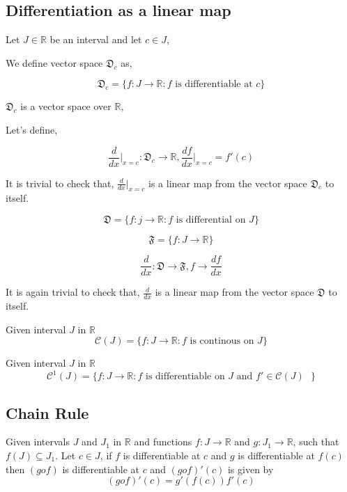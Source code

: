 \documentclass[11pt,a4paper]{colorart}
\def\R{\mathbb{R}}
\def\D{\mathfrak{D}}
\def\ra{\rightarrow}
\begin{document}
\subsection{Differentiation as a linear map}

Let $J \in \R$ be an interval and let $c\in J$,

We define vector space $\D_c$ as,

\[ \D_c = \{ f:J\ra\R : \text{$f$ is differentiable at $c$} \} \]

$\D_c$ is a vector space over $\R$,

Let's define,

\[ \frac{d}{dx} \biggr|_{ x=c } : \D_c \ra \R, \frac{df}{dx} \biggr|_{ x=c } = f'(c) \]

It is trivial to check that, $\frac{d}{dx} \biggr|_{ x=c }$ is a linear map from the vector space $\D_c$ to itself.

\[ \D = \{ f:j \ra \R : \text{$f$ is differential on $J$} \} \] 

\[ \mathfrak{F} = \{ f:J \ra \R \} \]

\[ \frac{d}{dx} : \D \ra \mathfrak{F} , f \ra \frac{df}{dx}  \]

It is again trivial to check that, $\frac{d}{dx}$ is a linear map from the vector space $\D$ to itself.

\begin{notation}
	Given interval $J$ in $\R$
	\[ \mathcal{C}(J) = \{ f:J \ra \R : \text{$f$ is continous on $J$} \}  \]
\end{notation}

\begin{notation}
	Given interval $J$ in $\R$
	\[ \mathcal{C}^1(J) = \{ f:J \ra \R : \text{$f$ is differentiable on $J$ and $f' \in \mathcal{C}(J)$ } \}  \]
\end{notation}

\subsection{Chain Rule}

\begin{theorem}
	Given intervals $J$ and $J_1$ in $\R$ and functions $f:J\ra \R$ and $g:J_1 \ra \R$, such that $f(J) \subseteq J_1$. 
	Let $c\in J$, if $f$ is differentiable at $c$ and $g$ is differentiable at $f(c)$ then $(gof)$ is differentiable at $c$ and $(gof)'(c)$ is given by
	\[ (gof)'(c) = g'(f(c))f'(c) \]
\end{theorem}
\end{document}
